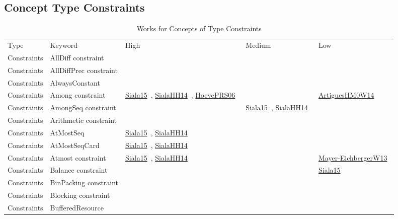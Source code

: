 \clearpage
\subsection{Concept Type Constraints}
\label{sec:Constraints}
{\scriptsize
\begin{longtable}{lp{3cm}>{\raggedright\arraybackslash}p{6cm}>{\raggedright\arraybackslash}p{6cm}>{\raggedright\arraybackslash}p{8cm}}
\rowcolor{white}\caption{Works for Concepts of Type Constraints}\\ \toprule
\rowcolor{white}Type & Keyword & High & Medium & Low\\ \midrule\endhead
\bottomrule
\endfoot
Constraints & AllDiff constraint &  &  & \\
Constraints & AllDiffPrec constraint &  &  & \\
Constraints & AlwaysConstant &  &  & \\
Constraints & Among constraint & \href{cars/works/Siala15.pdf}{Siala15}~\cite{Siala15}, \href{cars/works/SialaHH14.pdf}{SialaHH14}~\cite{SialaHH14}, \href{cars/works/HoevePRS06.pdf}{HoevePRS06}~\cite{HoevePRS06} &  & \href{cars/works/ArtiguesHM0W14.pdf}{ArtiguesHM0W14}~\cite{ArtiguesHM0W14}\\
Constraints & AmongSeq constraint &  & \href{cars/works/Siala15.pdf}{Siala15}~\cite{Siala15}, \href{cars/works/SialaHH14.pdf}{SialaHH14}~\cite{SialaHH14} & \\
Constraints & Arithmetic constraint &  &  & \\
Constraints & AtMostSeq & \href{cars/works/Siala15.pdf}{Siala15}~\cite{Siala15}, \href{cars/works/SialaHH14.pdf}{SialaHH14}~\cite{SialaHH14} &  & \\
Constraints & AtMostSeqCard & \href{cars/works/Siala15.pdf}{Siala15}~\cite{Siala15}, \href{cars/works/SialaHH14.pdf}{SialaHH14}~\cite{SialaHH14} &  & \\
Constraints & Atmost constraint & \href{cars/works/Siala15.pdf}{Siala15}~\cite{Siala15}, \href{cars/works/SialaHH14.pdf}{SialaHH14}~\cite{SialaHH14} &  & \href{cars/works/Mayer-EichbergerW13.pdf}{Mayer-EichbergerW13}~\cite{Mayer-EichbergerW13}\\
Constraints & Balance constraint &  &  & \href{cars/works/Siala15.pdf}{Siala15}~\cite{Siala15}\\
Constraints & BinPacking constraint &  &  & \\
Constraints & Blocking constraint &  &  & \\
Constraints & BufferedResource &  &  & \\

\end{longtable}}
